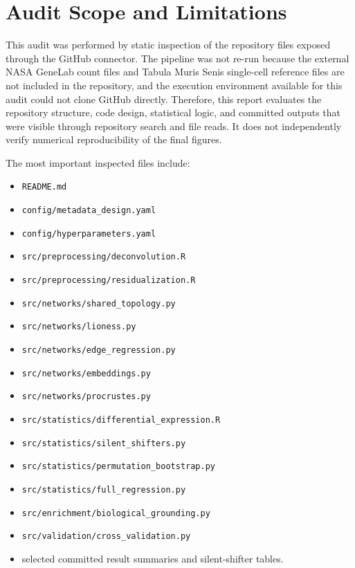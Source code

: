 \documentclass[11pt]{article}
\begin{document}
\section{Audit Scope and Limitations}

This audit was performed by static inspection of the repository files exposed through the GitHub connector.  The pipeline was not re-run because the external NASA GeneLab count files and Tabula Muris Senis single-cell reference files are not included in the repository, and the execution environment available for this audit could not clone GitHub directly.  Therefore, this report evaluates the repository structure, code design, statistical logic, and committed outputs that were visible through repository search and file reads.  It does not independently verify numerical reproducibility of the final figures.

The most important inspected files include:
\begin{itemize}[leftmargin=1.5em]
    \item \texttt{README.md}
    \item \texttt{config/metadata\_design.yaml}
    \item \texttt{config/hyperparameters.yaml}
    \item \texttt{src/preprocessing/deconvolution.R}
    \item \texttt{src/preprocessing/residualization.R}
    \item \texttt{src/networks/shared\_topology.py}
    \item \texttt{src/networks/lioness.py}
    \item \texttt{src/networks/edge\_regression.py}
    \item \texttt{src/networks/embeddings.py}
    \item \texttt{src/networks/procrustes.py}
    \item \texttt{src/statistics/differential\_expression.R}
    \item \texttt{src/statistics/silent\_shifters.py}
    \item \texttt{src/statistics/permutation\_bootstrap.py}
    \item \texttt{src/statistics/full\_regression.py}
    \item \texttt{src/enrichment/biological\_grounding.py}
    \item \texttt{src/validation/cross\_validation.py}
    \item selected committed result summaries and silent-shifter tables.
\end{itemize}
\end{document}
